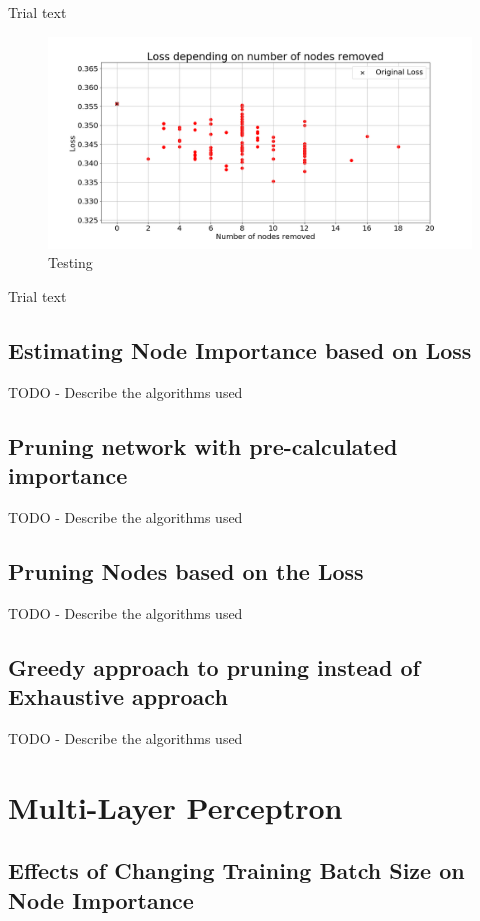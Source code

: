 \documentclass[UKenglish]{ifimaster}
\begin{document}
            Trial text

            \begin{figure}[h!]\centering
                \includegraphics[width=\textwidth]{Loss_vs_nodes_removed_fmnist.png}
                \caption[Short title]{Testing}
                \label{fig:loss_rn_imp_fmnist}
            \end{figure}

            Trial text

    \section{Estimating Node Importance based on Loss}
        TODO - Describe the algorithms used

    \section{Pruning network with pre-calculated importance}
        TODO - Describe the algorithms used

    \section{Pruning Nodes based on the Loss}
        TODO - Describe the algorithms used

    \section{Greedy approach to pruning instead of Exhaustive approach}
        TODO - Describe the algorithms used

\chapter{Multi-Layer Perceptron}
    \section{Effects of Changing Training Batch Size on Node Importance}
\end{document}
